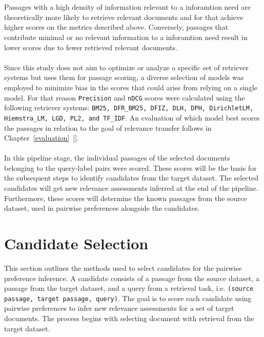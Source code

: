 \\\\
Passages with a high density of information relevant to a inforamtion need are theoretically more likely to retrieve relevant documents and  for that achieve higher scores on the metrics described above. Conversely, passages that contribute minimal or no relevant information to a inforamtion need result in lower scores due to fewer retrieved relevant documents.
\\\\
Since this study does not aim to optimize or analyze a specific set of retriever systems but uses them for passage scoring, a diverse selection of models was employed to minimize bias in the scores that could arise from relying on a single model. For that reason \texttt{Precision} and \texttt{nDCG} scores were calculated using the following retriever systems: \texttt{BM25, DFR\_BM25, DFIZ, DLH, DPH, DirichletLM, Hiemstra\_LM, LGD, PL2, and TF\_IDF}. An evaluation of which model best scores the passages in relation to the goal of relevance transfer follows in Chapter~\ref{evaluation}~[].
\\\\
In this pipeline stage, the individual passages of the selected documents belonging to the query-label pairs were scored. These scores will be the basis for the subsequent steps to identify candidates from the target dataset. The selected candidates will get new relevance assessments inferred at the end of the pipeline. Furthermore, these scores will determine the known passages from the source dataset, used in pairwise preferences alongside the candidates.


\section{Candidate Selection}\label{candidate-selection}

This section outlines the methods used to select candidates for the pairwise preference inference. A candidate consists of a passage from the source dataset, a passage from the target dataset, and a query from a retrieval task, i.e. \texttt{(source passage, target passage, query)}. The goal is to score each candidate using pairwise preferences to infer new relevance assessments for a set of target documents. The process begins with selecting document with retrieval from the target dataset.


